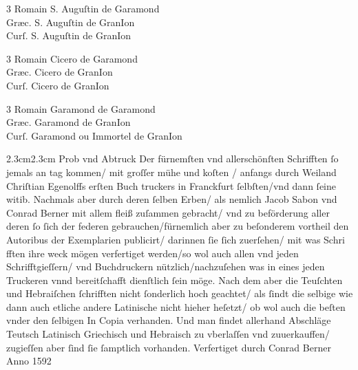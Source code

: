 \documentclass[draft]{article}
\newcommand{\threecolumntypefacenames}[3]{\begin{multicols}{3}
		\tiny
		\hfill \qquad \qquad \qquad \qquad #1\hspace*{\fill}\\
		\columnbreak
		\hfill #2\hspace*{\fill}\\
		\columnbreak
		\hfill #3\qquad \qquad \qquad \qquad \hspace*{\fill}
\end{multicols}}
\begin{document}
\threecolumntypefacenames{Romain S. Auguſtin de Garamond}{Gr\ae{}c. S. Auguſtin de GranIon}{Curſ. S. Auguſtin de GranIon}
\threecolumntypefacenames{Romain Cicero de Garamond}{Gr\ae{}c. Cicero de GranIon}{Curſ. Cicero de GranIon}
\threecolumntypefacenames{Romain Garamond de Garamond}{Gr\ae{}c. Garamond de GranIon}{Curſ. Garamond ou Immortel de GranIon}
\begin{adjustwidth}{2.3cm}{2.3cm}
	\fraktur
	\tiny
	\noindent
	Prob vnd Abtruck Der fürnemſten vnd allerschönſten Schrifften ſo jemals an tag kommen/ mit groſſer mühe und koſten / anfangs durch Weiland Chriſtian Egenolffs erſten Buch\linebreak
	truckers in Franckfurt ſelbſten/vnd dann ſeine witib. Nachmals aber durch deren ſelben Erben/ als nemlich Jacob Sabon vnd Conrad Berner mit allem fleiß zuſammen gebracht/ vnd\linebreak
	zu beförderung aller deren ſo ſich der federen gebrauchen/fürnemlich aber zu beſonderem vortheil den \normalfont Autoribus \fraktur der \normalfont Exemplarien publicirt\fraktur / darinnen ſie ſich zuerſehen/ mit was Schri\linebreak
	fften ihre weck mögen verfertiget werden/so wol auch allen vnd jeden Schrifftgieſſern/ vnd Buchdruckern nützlich/nachzuſehen was in eines jeden Truckeren vnnd bereitſchafft dienſtlich\linebreak
	ſein möge. Nach dem aber die Teuſchten und Hebraiſchen ſchrifften nicht ſonderlich hoch geachtet/ als ſindt die selbige wie dann auch etliche andere Latinische nicht hieher heſetzt/ ob wol\linebreak
	auch die beſten vnder den ſelbigen \normalfont In Copia \fraktur verhanden. Und man findet allerhand Abschläge Teutsch Latinisch Griechisch und Hebraisch zu vberlaſſen vnd zuuerkauffen/ zugieſſen aber\linebreak
	ſind ſie ſamptlich vorhanden. Verfertiget durch Conrad Berner Anno 1592
\end{adjustwidth}
\end{document}
